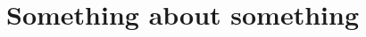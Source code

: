 \captionsetup*{format=largeformat}
\section{Something about something} \label{note:Note1}
\Blindtext
